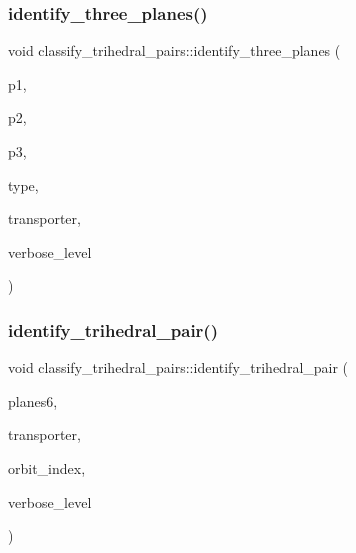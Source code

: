 \mbox{\label{classclassify__trihedral__pairs_a0c39bec96db456430eb119aa573f6d25}} 
\subsubsection{\texorpdfstring{identify\+\_\+three\+\_\+planes()}{identify\_three\_planes()}}
{\footnotesize\ttfamily void classify\+\_\+trihedral\+\_\+pairs\+::identify\+\_\+three\+\_\+planes (\begin{DoxyParamCaption}\item[{\mbox{\hyperlink{galois_8h_a09fddde158a3a20bd2dcadb609de11dc}{I\+NT}}}]{p1,  }\item[{\mbox{\hyperlink{galois_8h_a09fddde158a3a20bd2dcadb609de11dc}{I\+NT}}}]{p2,  }\item[{\mbox{\hyperlink{galois_8h_a09fddde158a3a20bd2dcadb609de11dc}{I\+NT}}}]{p3,  }\item[{\mbox{\hyperlink{galois_8h_a09fddde158a3a20bd2dcadb609de11dc}{I\+NT}} \&}]{type,  }\item[{\mbox{\hyperlink{galois_8h_a09fddde158a3a20bd2dcadb609de11dc}{I\+NT}} $\ast$}]{transporter,  }\item[{\mbox{\hyperlink{galois_8h_a09fddde158a3a20bd2dcadb609de11dc}{I\+NT}}}]{verbose\+\_\+level }\end{DoxyParamCaption})}

\mbox{\label{classclassify__trihedral__pairs_a1a85f616b5043da9f7e585868b0d191d}} 
\subsubsection{\texorpdfstring{identify\+\_\+trihedral\+\_\+pair()}{identify\_trihedral\_pair()}}
{\footnotesize\ttfamily void classify\+\_\+trihedral\+\_\+pairs\+::identify\+\_\+trihedral\+\_\+pair (\begin{DoxyParamCaption}\item[{\mbox{\hyperlink{galois_8h_a09fddde158a3a20bd2dcadb609de11dc}{I\+NT}} $\ast$}]{planes6,  }\item[{\mbox{\hyperlink{galois_8h_a09fddde158a3a20bd2dcadb609de11dc}{I\+NT}} $\ast$}]{transporter,  }\item[{\mbox{\hyperlink{galois_8h_a09fddde158a3a20bd2dcadb609de11dc}{I\+NT}} \&}]{orbit\+\_\+index,  }\item[{\mbox{\hyperlink{galois_8h_a09fddde158a3a20bd2dcadb609de11dc}{I\+NT}}}]{verbose\+\_\+level }\end{DoxyParamCaption})}

